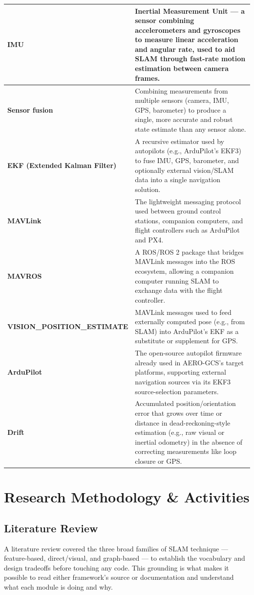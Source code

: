 \documentclass[11pt,a4paper]{article}
\begin{document}
\begin{longtable}{@{}p{4.5cm}p{10.5cm}@{}}
    \midrule
    \textbf{IMU} & Inertial Measurement Unit --- a sensor combining accelerometers and gyroscopes to measure linear acceleration and angular rate, used to aid SLAM through fast-rate motion estimation between camera frames. \\
    \midrule
    \textbf{Sensor fusion} & Combining measurements from multiple sensors (camera, IMU, GPS, barometer) to produce a single, more accurate and robust state estimate than any sensor alone. \\
    \midrule
    \textbf{EKF (Extended Kalman Filter)} & A recursive estimator used by autopilots (e.g., ArduPilot's EKF3) to fuse IMU, GPS, barometer, and optionally external vision/SLAM data into a single navigation solution. \\
    \midrule
    \textbf{MAVLink} & The lightweight messaging protocol used between ground control stations, companion computers, and flight controllers such as ArduPilot and PX4. \\
    \midrule
    \textbf{MAVROS} & A ROS/ROS 2 package that bridges MAVLink messages into the ROS ecosystem, allowing a companion computer running SLAM to exchange data with the flight controller. \\
    \midrule
    \textbf{VISION\_POSITION\_ESTIMATE} & MAVLink messages used to feed externally computed pose (e.g., from SLAM) into ArduPilot's EKF as a substitute or supplement for GPS. \\
    \midrule
    \textbf{ArduPilot} & The open-source autopilot firmware already used in AERO-GCS's target platforms, supporting external navigation sources via its EKF3 source-selection parameters. \\
    \midrule
    \textbf{Drift} & Accumulated position/orientation error that grows over time or distance in dead-reckoning-style estimation (e.g., raw visual or inertial odometry) in the absence of correcting measurements like loop closure or GPS. \\
\end{longtable}

\newpage

\section{Research Methodology \& Activities}

\subsection{Literature Review}
A literature review covered the three broad families of SLAM technique --- feature-based, direct/visual, and graph-based --- to establish the vocabulary and design tradeoffs before touching any code. This grounding is what makes it possible to read either framework's source or documentation and understand what each module is doing and why.
\end{document}

